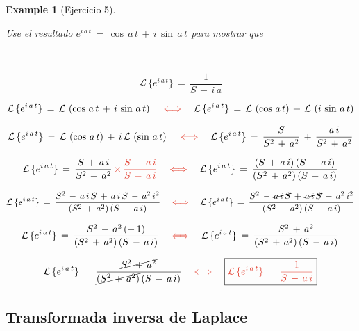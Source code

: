 \documentclass[a4paper,11pt,openany]{book}
\newtheorem{exmp}{Example}[section]
\begin{document}
\begin{exmp}[Ejercicio 5]
 
 
\
 
Use el resultado $e^{i\,a\,t}\,=\,\cos\,a\,t\,+\,i\,\sin\,a\,t$ para mostrar que 
 
\ 
 
$$\boxed{\mathcal{L}\,\{e^{i\,a\,t} \}\,=\,\dfrac{1}{S\,-\,i\,a} }$$
 
$$\mathcal{L}\,\{e^{i\,a\,t} \}\,=\,\mathcal{L}\,\left(\cos\,a\,t\,+\,i\,\sin\,a\,t \right) \quad \textcolor{vermilion}{\iff} \quad \mathcal{L}\,\{e^{i\,a\,t} \}\,=\,\mathcal{L}\,\left(\cos\,a\,t \right)\,+\,\mathcal{L}\,\left(i\,\sin\,a\,t \right)$$
 
$$\mathcal{L}\,\{e^{i\,a\,t} \}\,=\,\mathcal{L}\,\left(\cos\,a\,t \right)\,+\,i\,\mathcal{L}\,\left(\sin\,a\,t \right) \quad \textcolor{vermilion}{\iff} \quad \mathcal{L}\,\{e^{i\,a\,t} \}\,=\,\dfrac{S}{S^{2}\,+\,a^{2}}\,+\,\dfrac{a\,i}{S^{2}\,+\,a^{2}}$$
 
$$\mathcal{L}\,\{e^{i\,a\,t} \}\,=\,\dfrac{S\,+\,a\,i}{S^{2}\,+\,a^{2}}\,\textcolor{vermilion}{\times}\,\textcolor{vermilion}{\dfrac{S\,-\,a\,i}{S\,-\,a\,i}} \quad \textcolor{vermilion}{\iff} \quad \mathcal{L}\,\{e^{i\,a\,t} \}\,=\,\dfrac{(S\,+\,a\,i)\,(S\,-\,a\,i)}{(S^{2}\,+\,a^{2})\,(S\,-\,a\,i) } $$
 
$$\mathcal{L}\,\{e^{i\,a\,t} \}\,=\,\dfrac{S^{2}\,-\,a\,i\,S\,+\,a\,i\,S\,-\,a^{2}\,i^{2} }{(S^{2}\,+\,a^{2})\,(S\,-\,a\,i) } \quad \textcolor{vermilion}{\iff} \quad  \mathcal{L}\,\{e^{i\,a\,t} \}\,=\,\dfrac{S^{2}\,-\,\cancel{a\,i\,S}\,+\,\cancel{a\,i\,S}\,-\,a^{2}\,i^{2} }{(S^{2}\,+\,a^{2})\,(S\,-\,a\,i) }$$
 
$$\mathcal{L}\,\{e^{i\,a\,t} \}\,=\,\dfrac{S^{2}\,-\,a^{2}\,(-\,1) }{(S^{2}\,+\,a^{2})\,(S\,-\,a\,i) } \quad \textcolor{vermilion}{\iff} \quad \mathcal{L}\,\{e^{i\,a\,t} \}\,=\,\dfrac{S^{2}\,+\,a^{2} }{(S^{2}\,+\,a^{2})\,(S\,-\,a\,i) }$$
 
$$\mathcal{L}\,\{e^{i\,a\,t} \}\,=\,\dfrac{\cancel{S^{2}\,+\,a^{2}} }{\cancel{(S^{2}\,+\,a^{2})}\,(S\,-\,a\,i) } \quad \textcolor{vermilion}{\iff} \quad \boxed{\textcolor{vermilion}{\mathcal{L}\,\{e^{i\,a\,t} \}\,=\,\dfrac{1}{S\,-\,a\,i} } } $$
 
\end{exmp}
 
 
\textcolor{ao(english)}{\chapter{Transformada inversa de Laplace } } 
 
\end{document}
